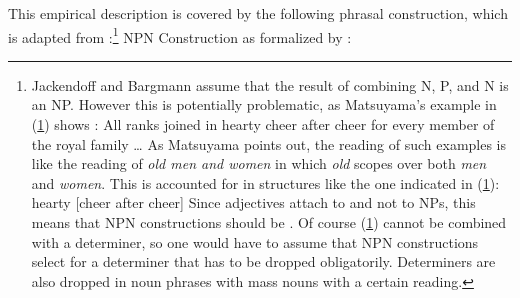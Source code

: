 \documentclass[output=paper,biblatex,babelshorthands,newtxmath,draftmode,colorlinks,citecolor=brown]{langscibook}
\begin{document}
This empirical description is covered by the following phrasal construction, which is adapted from
:\footnote{%
Jackendoff and Bargmann assume that the result of combining N, P, and N is an NP. However this is
potentially problematic, as Matsuyama's example in (\ref{ex-hearty-chear-after-chear}) shows \citep[]{Matsuyama2004a}:
\ea
\label{ex-hearty-chear-after-chear}
All ranks joined in hearty cheer after cheer for every member of the royal family \ldots
\z
As Matsuyama points out, the reading of such examples is like the reading of \emph{old men and women}
in which \emph{old} scopes over both \emph{men} and \emph{women}. This is accounted for in
structures like the one indicated in (\ref{ex-hearty-cheer-after-cheer}):
\ea
\label{ex-hearty-cheer-after-cheer}
hearty [cheer after cheer]
\z
Since adjectives attach to \nbars and not to NPs, this means that NPN constructions should be
\nbars. Of course (\ref{ex-hearty-cheer-after-cheer}) cannot be combined with a determiner, so one would have to assume that
NPN constructions select for a determiner that has to be dropped obligatorily. Determiners are also
dropped in noun phrases with mass nouns with a certain reading.
}
\ea
\label{ex-npn-bragmann}%
NPN Construction as formalized by :\\
\end{document}
